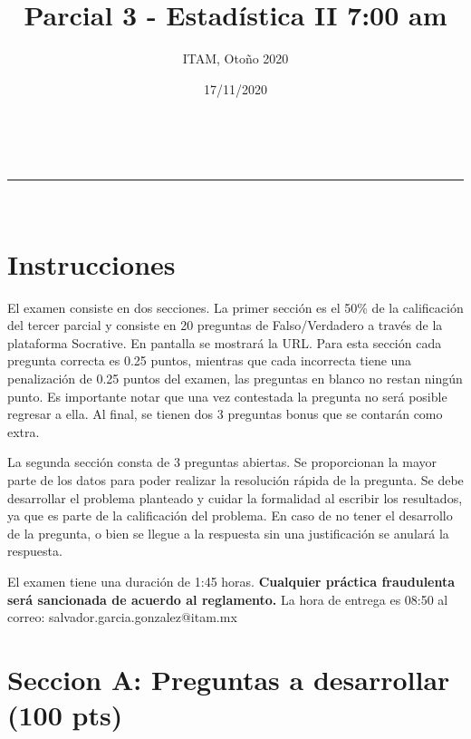 \documentclass[addpoints]{exam}
\makeatletter
\newcommand{\linia}{\rule{\linewidth}{0.5pt}}
\theoremstyle{mytheor}
\renewcommand{\maketitle}{
    \begin{center}
    \vspace{2ex}
    {\huge \textsc{\@title}}
    \vspace{1ex}
    \\
    \linia\\
    \@author \hfill \@date
    \vspace{4ex}
    \end{center}
  }
\makeatother
\begin{document}
  
  \title{Parcial 3 - Estadística II 7:00 am}
  
  \author{ITAM, Otoño 2020}
  
  \date{17/11/2020}
  
  \maketitle
  
  \section*{Instrucciones}
  
El examen consiste en dos secciones. La primer sección es el 50\% de la calificación del tercer parcial y consiste en 20 preguntas de Falso/Verdadero a través de la plataforma Socrative. En pantalla se mostrará la URL. Para esta sección cada pregunta correcta es 0.25 puntos, mientras que cada incorrecta tiene una penalización de 0.25 puntos del examen, las preguntas en blanco no restan ningún punto. Es importante notar que una vez contestada la pregunta no será posible regresar a ella. Al final, se tienen dos 3 preguntas bonus que se contarán como extra. 
 
 \vspace{10pt}
 
La segunda sección consta de 3 preguntas abiertas. Se proporcionan la mayor parte de los datos para poder realizar la resolución rápida de la pregunta. Se debe desarrollar el problema planteado y cuidar la formalidad al escribir los resultados, ya que es parte de la calificación del problema. En caso de no tener el desarrollo de la pregunta, o bien se llegue a la respuesta sin una justificación se anulará la respuesta. 

\vspace{10pt}
  
El examen tiene una duración de 1:45 horas. \textbf{Cualquier práctica fraudulenta será sancionada de acuerdo al reglamento.} La hora de entrega es 08:50 al correo: salvador.garcia.gonzalez@itam.mx

\section*{Seccion A: Preguntas a desarrollar (100 pts)}
  
\end{document}
